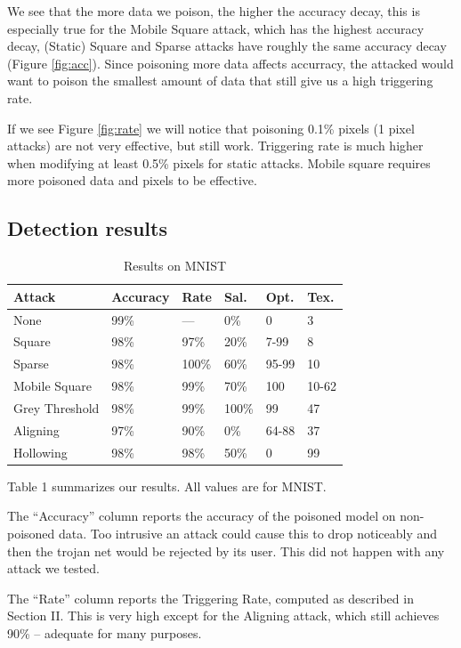 \documentclass[letterpaper, 10 pt, conference]{ieeeconf}  %
\begin{document}
We see that the more data we poison, the higher the accuracy decay, this is
especially true for the Mobile Square attack, which has the highest accuracy
decay, (Static) Square and Sparse attacks have roughly the same accuracy
decay (Figure \ref{fig:acc}). Since poisoning more data affects accurracy, the attacked would want to poison
the smallest amount of data that still give us a high triggering rate.

If we see Figure \ref{fig:rate} we will notice that poisoning 0.1\% pixels
(1 pixel attacks) are not very effective, but still work. Triggering
rate is much higher when modifying at least 0.5\% pixels for static attacks.
Mobile square requires more poisoned data and pixels to be effective.


\subsection{Detection results}

\begin{table}
  \begin{tabularx}{0.48\textwidth}{llllll}
    \hline
    Attack & Accuracy & Rate & Sal. & Opt. & Tex.\\
    \hline
    None & 99\% & ---  & 0\% & 0 & 3\\
    Square & 98\% & 97\% & 20\% & 7-99 & 8\\
    Sparse & 98\% & 100\% & 60\% & 95-99 & 10\\
    Mobile Square & 98\% & 99\% & 70\% & 100 & 10-62\\
    Grey Threshold & 98\% & 99\% & 100\% & 99 & 47\\
    Aligning & 97\% & 90\% & 0\% & 64-88 & 37\\
    Hollowing & 98\% & 98\% & 50\% & 0 & 99\\
    \hline
  \end{tabularx}
  \caption{Results on MNIST}
\end{table}

Table 1 summarizes our results.  All values are for MNIST.

The ``Accuracy'' column reports the accuracy of the poisoned model on
non-poisoned data.  Too intrusive an attack could cause this to drop
noticeably and then the trojan net would be rejected by its user.
This did not happen with any attack we tested.

The ``Rate'' column reports the Triggering Rate, computed as described
in Section II.  This is very high except for the Aligning attack,
which still achieves 90\% -- adequate for many purposes.
\end{document}
